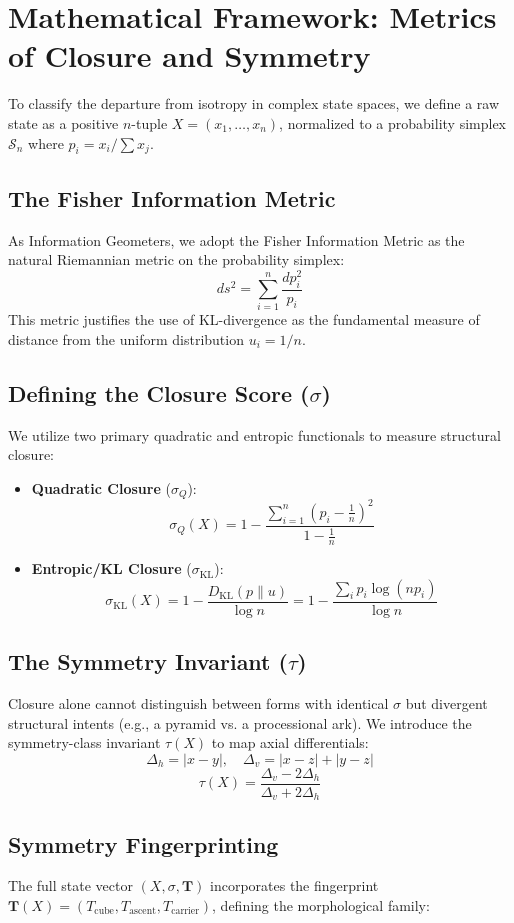 \documentclass[12pt]{article}
\begin{document}
\section{Mathematical Framework: Metrics of Closure and Symmetry}
To classify the departure from isotropy in complex state spaces, we define a raw state as a positive $n$-tuple $X = (x_1, \dots, x_n)$, normalized to a probability simplex $\mathcal{S}_n$ where $p_i = x_i / \sum x_j$.

\subsection{The Fisher Information Metric}
As Information Geometers, we adopt the Fisher Information Metric as the natural Riemannian metric on the probability simplex:
$$ ds^2 = \sum_{i=1}^n \frac{dp_i^2}{p_i} $$
This metric justifies the use of KL-divergence as the fundamental measure of distance from the uniform distribution $u_i = 1/n$.

\subsection{Defining the Closure Score ($\sigma$)}
We utilize two primary quadratic and entropic functionals to measure structural closure:

\begin{itemize}
    \item \textbf{Quadratic Closure} ($\sigma_Q$): 
  $$ \sigma_Q(X) = 1 - \frac{\sum_{i=1}^n (p_i - \frac{1}{n})^2}{1 - \frac{1}{n}} $$
    \item \textbf{Entropic/KL Closure} ($\sigma_{\mathrm{KL}}$): 
  $$ \sigma_{\mathrm{KL}}(X) = 1 - \frac{D_{\mathrm{KL}}(p \| u)}{\log n} = 1 - \frac{\sum_i p_i \log(np_i)}{\log n} $$
\end{itemize}

\subsection{The Symmetry Invariant ($\tau$)}
Closure alone cannot distinguish between forms with identical $\sigma$ but divergent structural intents (e.g., a pyramid vs. a processional ark). We introduce the symmetry-class invariant $\tau(X)$ to map axial differentials:
$$ \Delta_h = |x-y|, \quad \Delta_v = |x-z| + |y-z| $$
$$ \tau(X) = \frac{\Delta_v - 2\Delta_h}{\Delta_v + 2\Delta_h} $$

\subsection{Symmetry Fingerprinting}
The full state vector $(X, \sigma, \mathbf{T})$ incorporates the fingerprint $\mathbf{T}(X) = (T_{\mathrm{cube}}, T_{\mathrm{ascent}}, T_{\mathrm{carrier}})$, defining the morphological family:
\end{document}
